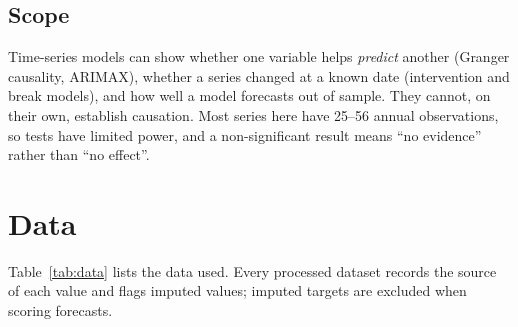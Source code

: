 \documentclass[11pt,a4paper]{article}
\begin{document}
\subsection{Scope}
Time-series models can show whether one variable helps \emph{predict} another (Granger causality, ARIMAX), whether a series changed at a known date (intervention and break models), and how well a model forecasts out of sample. They cannot, on their own, establish causation. Most series here have 25--56 annual observations, so tests have limited power, and a non-significant result means ``no evidence'' rather than ``no effect''.

\section{Data}
Table~\ref{tab:data} lists the data used. Every processed dataset records the source of each value and flags imputed values; imputed targets are excluded when scoring forecasts.
\end{document}
